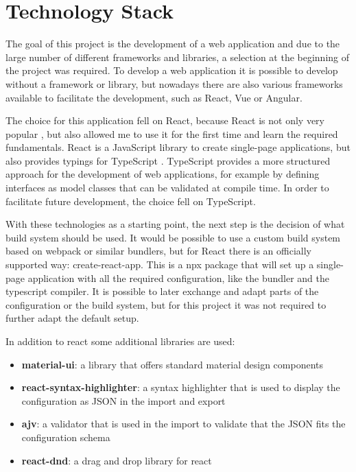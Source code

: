 \chapter{Technology Stack}
\label{sec:tech_stack}
The goal of this project is the development of a web application and due to the large number of different frameworks and libraries, a selection at the beginning of the project was required. To develop a web application it is possible to develop without a framework or library, but nowadays there are also various frameworks available to facilitate the development, such as React, Vue or Angular.

The choice for this application fell on React, because React is not only very popular \cite{2020DeveloperSurvey}, but also allowed me to  use it for the first time and learn the required fundamentals. React is a JavaScript library to create single-page applications, but also provides typings for TypeScript \cite{createReactApp}. TypeScript provides a more structured approach for the development of web applications, for example by defining interfaces as model classes that can be validated at compile time. In order to facilitate future development, the choice fell on TypeScript. 

With these technologies as a starting point, the next step is the decision of what build system should be used. It would be possible to use a custom build system based on webpack or similar bundlers, but for React there is an officially supported way: create-react-app. This is a npx package that will set up a single-page application with all the required configuration, like the bundler and the typescript compiler. It is possible to later exchange and adapt parts of the configuration or the build system, but for this project it was not required to further adapt the default setup.

In addition to react some additional libraries are used:

\begin{itemize}
    \item \textbf{material-ui}: a library that offers standard material design components
    \item \textbf{react-syntax-highlighter}: a syntax highlighter that is used to display the configuration as JSON in the import and export 
    \item \textbf{ajv}: a validator that is used in the import to validate that the JSON fits the configuration schema
    \item \textbf{react-dnd}: a drag and drop library for react
\end{itemize}

\newpage